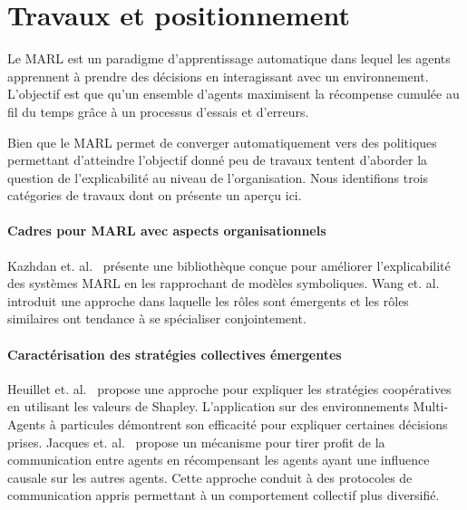 \documentclass[demonstration]{jfsma}
\begin{document}




\section{Travaux et positionnement}

Le MARL est un paradigme d'apprentissage automatique dans lequel les agents apprennent à prendre des décisions en interagissant avec un environnement. L’objectif est que qu'un ensemble d'agents maximisent la récompense cumulée au fil du temps grâce à un processus d’essais et d’erreurs.

Bien que le MARL permet de converger automatiquement vers des politiques permettant d'atteindre l'objectif donné peu de travaux tentent d’aborder la question de l'explicabilité au niveau de l'organisation. Nous identifions trois catégories de travaux dont on présente un aperçu ici.

\paragraph{\textbf{Cadres pour MARL avec aspects organisationnels}}
%
Kazhdan et. al.~\cite{Kazhdan2020} présente une bibliothèque conçue pour améliorer l'explicabilité des systèmes MARL en les rapprochant de modèles symboliques.
%
Wang et. al.~\cite{Wang2020} introduit une approche dans laquelle les rôles sont émergents et les rôles similaires ont tendance à se spécialiser conjointement.
%
%

\paragraph{\textbf{Caractérisation des stratégies collectives émergentes}}
%
Heuillet et. al.~\cite{Heuillet2022} propose une approche pour expliquer les stratégies coopératives en utilisant les valeurs de Shapley. L'application sur des environnements Multi-Agents à particules démontrent son efficacité pour expliquer certaines décisions prises.
%
Jacques et. al.~\cite{Jaques2019} propose un mécanisme pour tirer profit de la communication entre agents en récompensant les agents ayant une influence causale sur les autres agents. Cette approche conduit à des protocoles de communication appris permettant à un comportement collectif plus diversifié.
\end{document}
